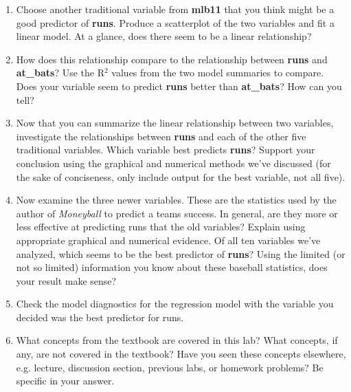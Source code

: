 \documentclass{article}\usepackage[]{graphicx}\usepackage[]{color}
\newcommand{\hlkwd}[1]{\textcolor[rgb]{0.737,0.353,0.396}{\textbf{#1}}}%
\begin{document}
\begin{enumerate}
\item Choose another traditional variable from \hlkwd{mlb11} that you think might be a good predictor of \hlkwd{runs}. Produce a scatterplot of the two variables and fit a linear model.  At a glance, does there seem to be a linear relationship?

\item How does this relationship compare to the relationship between \hlkwd{runs} and \hlkwd{at\_bats}? Use the R$^2$ values from the two model summaries to compare.  Does your variable seem to predict \hlkwd{runs} better than \hlkwd{at\_bats}?  How can you tell?

\item Now that you can summarize the linear relationship between two variables, investigate the relationships between \hlkwd{runs} and each of the other five traditional variables. Which variable best predicts \hlkwd{runs}? Support your conclusion using the graphical and numerical methods we've discussed (for the sake of conciseness, only include output for the best variable, not all five).

\item Now examine the three newer variables.  These are the statistics used by the author of \emph{Moneyball} to predict a teams success.  In general, are they more or less effective at predicting runs that the old variables?  Explain using appropriate graphical and numerical evidence.  Of all ten variables we've analyzed, which seems to be the best predictor of \hlkwd{runs}?  Using the limited (or not so limited) information you know about these baseball statistics, does your result make sense?

\item Check the model diagnostics for the regression model with the variable you decided was the best predictor for runs.

\item What concepts from the textbook are covered in this lab? What concepts, if any, are not covered in the textbook? Have you seen these concepts elsewhere, e.g. lecture, discussion section, previous labs, or homework problems? Be specific in your answer.

\end{enumerate}
\end{document}

